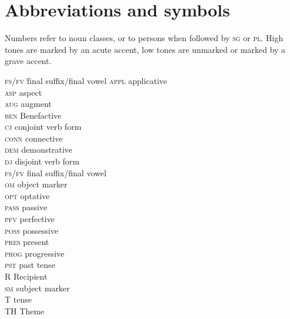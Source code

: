 \documentclass[output=paper
,modfonts
,nonflat]{langsci/langscibook}
\begin{document}
\section*{Abbreviations and symbols}
Numbers refer to noun classes, or to persons when followed by \textsc{sg} or \textsc{pl}. High tones are marked by an acute accent, low tones are unmarked or marked by a grave accent.
\begin{multicols}{2}
		\begin{tabbing}
			\textsc{fs/fv}\hspace{5mm} \= final suffix/final vowel\kill
		\textsc{appl} 	\> applicative \\
		\textsc{asp} 	\> aspect \\ 	
		\textsc{aug} 	\> augment 	\\					
		\textsc{ben} 	\> Benefactive \\	
		\textsc{cj} 	\> conjoint verb form 	\\		 
		\textsc{conn} \> connective \\	
		\textsc{dem}	\> demonstrative \\				 
		\textsc{dj} 	\> disjoint verb form \\ 
		\textsc{fs/fv} 	\> final suffix/final vowel 	\\	 
		\textsc{om} 	\> object marker \\	
		\textsc{opt}	\> optative \\						 
		\textsc{pass} \> passive \\	
		\textsc{pfv} \> perfective 	\\				 
		\textsc{poss} \> possessive \\	
		\textsc{pres} 	\> present 	\\					 
		\textsc{prog} \> progressive \\	
		\textsc{pst} 	\> past tense 	\\				 
		R 			\> Recipient \\	
		\textsc{sm} 	\> subject marker \\				
		T 			\> tense \\	
		TH 				\> Theme 										
	\end{tabbing} 
\end{multicols}
\end{document}
